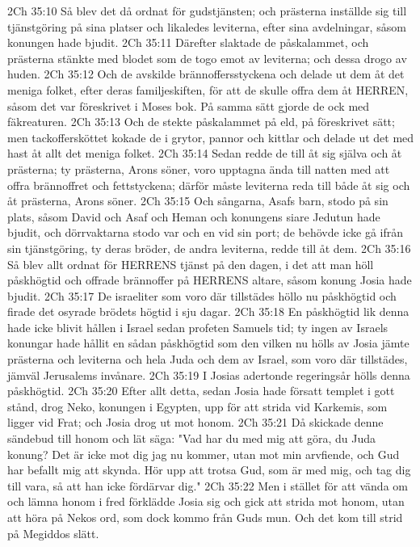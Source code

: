 2Ch 35:10  Så blev det då ordnat för gudstjänsten; och prästerna inställde sig till tjänstgöring på sina platser och likaledes leviterna, efter sina avdelningar, såsom konungen hade bjudit.
2Ch 35:11  Därefter slaktade de påskalammet, och prästerna stänkte med blodet som de togo emot av leviterna; och dessa drogo av huden.
2Ch 35:12  Och de avskilde brännoffersstyckena och delade ut dem åt det meniga folket, efter deras familjeskiften, för att de skulle offra dem åt HERREN, såsom det var föreskrivet i Moses bok. På samma sätt gjorde de ock med fäkreaturen.
2Ch 35:13  Och de stekte påskalammet på eld, på föreskrivet sätt; men tackoffersköttet kokade de i grytor, pannor och kittlar och delade ut det med hast åt allt det meniga folket.
2Ch 35:14  Sedan redde de till åt sig själva och åt prästerna; ty prästerna, Arons söner, voro upptagna ända till natten med att offra brännoffret och fettstyckena; därför måste leviterna reda till både åt sig och åt prästerna, Arons söner.
2Ch 35:15  Och sångarna, Asafs barn, stodo på sin plats, såsom David och Asaf och Heman och konungens siare Jedutun hade bjudit, och dörrvaktarna stodo var och en vid sin port; de behövde icke gå ifrån sin tjänstgöring, ty deras bröder, de andra leviterna, redde till åt dem.
2Ch 35:16  Så blev allt ordnat för HERRENS tjänst på den dagen, i det att man höll påskhögtid och offrade brännoffer på HERRENS altare, såsom konung Josia hade bjudit.
2Ch 35:17  De israeliter som voro där tillstädes höllo nu påskhögtid och firade det osyrade brödets högtid i sju dagar.
2Ch 35:18  En påskhögtid lik denna hade icke blivit hållen i Israel sedan profeten Samuels tid; ty ingen av Israels konungar hade hållit en sådan påskhögtid som den vilken nu hölls av Josia jämte prästerna och leviterna och hela Juda och dem av Israel, som voro där tillstädes, jämväl Jerusalems invånare.
2Ch 35:19  I Josias adertonde regeringsår hölls denna påskhögtid.
2Ch 35:20  Efter allt detta, sedan Josia hade försatt templet i gott stånd, drog Neko, konungen i Egypten, upp för att strida vid Karkemis, som ligger vid Frat; och Josia drog ut mot honom.
2Ch 35:21  Då skickade denne sändebud till honom och lät säga: "Vad har du med mig att göra, du Juda konung? Det är icke mot dig jag nu kommer, utan mot min arvfiende, och Gud har befallt mig att skynda. Hör upp att trotsa Gud, som är med mig, och tag dig till vara, så att han icke fördärvar dig."
2Ch 35:22  Men i stället för att vända om och lämna honom i fred förklädde Josia sig och gick att strida mot honom, utan att höra på Nekos ord, som dock kommo från Guds mun. Och det kom till strid på Megiddos slätt.
